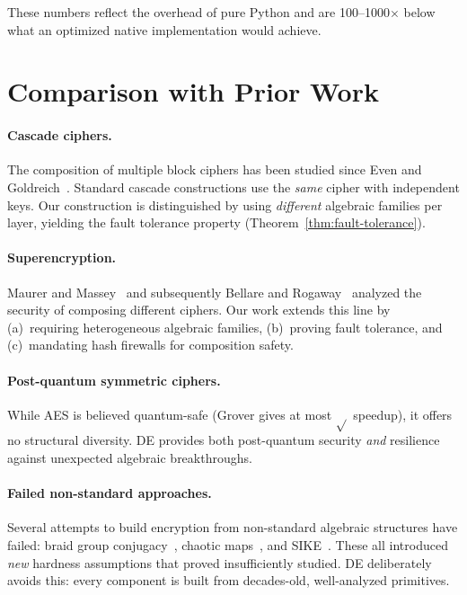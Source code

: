 \documentclass[11pt]{article}
\newcommand{\DE}{\textsf{DE}}
\begin{document}
These numbers reflect the overhead of pure Python and are 100--1000$\times$
below what an optimized native implementation would achieve.

\section{Comparison with Prior Work}
\label{sec:related}

\paragraph{Cascade ciphers.}
The composition of multiple block ciphers has been studied since
Even and Goldreich~\cite{even1997}. Standard cascade constructions use
the \emph{same} cipher with independent keys. Our construction is
distinguished by using \emph{different} algebraic families per layer,
yielding the fault tolerance property (Theorem~\ref{thm:fault-tolerance}).

\paragraph{Superencryption.}
Maurer and Massey~\cite{maurer1993} and subsequently
Bellare and Rogaway~\cite{bellare2006} analyzed the security of composing
different ciphers. Our work extends this line by (a)~requiring heterogeneous
algebraic families, (b)~proving fault tolerance, and (c)~mandating hash
firewalls for composition safety.

\paragraph{Post-quantum symmetric ciphers.}
While AES is believed quantum-safe (Grover gives at most $\sqrt{}$ speedup),
it offers no structural diversity. \DE{} provides both post-quantum security
\emph{and} resilience against unexpected algebraic breakthroughs.

\paragraph{Failed non-standard approaches.}
Several attempts to build encryption from non-standard algebraic structures
have failed: braid group conjugacy~\cite{dehornoy2006}, chaotic
maps~\cite{alvarez2006}, and SIKE~\cite{castryck2022}. These all
introduced \emph{new} hardness assumptions that proved insufficiently
studied. \DE{} deliberately avoids this: every component is built from
decades-old, well-analyzed primitives.
\end{document}
